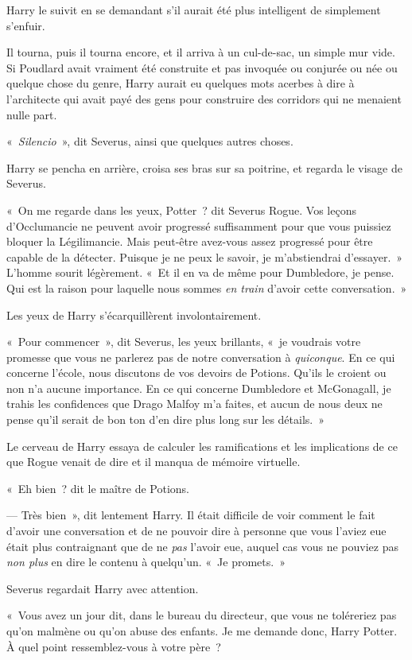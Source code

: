 Harry le suivit en se demandant s'il aurait été plus intelligent de simplement s'enfuir.

Il tourna, puis il tourna encore, et il arriva à un cul-de-sac, un simple mur vide.
Si Poudlard avait vraiment été construite et pas invoquée ou conjurée ou née ou quelque chose du genre, Harry aurait eu quelques mots acerbes à dire à l'architecte qui avait payé des gens pour construire des corridors qui ne menaient nulle part.

«~\emph{Silencio}~», dit Severus, ainsi que quelques autres choses.

Harry se pencha en arrière, croisa ses bras sur sa poitrine, et regarda le visage de Severus.

«~On me regarde dans les yeux, Potter~? dit Severus Rogue.
Vos leçons d'Occlumancie ne peuvent avoir progressé suffisamment pour que vous puissiez bloquer la Légilimancie.
Mais peut-être avez-vous assez progressé pour être capable de la détecter.
Puisque je ne peux le savoir, je m'abstiendrai d'essayer.~»
L'homme sourit légèrement.
«~Et il en va de même pour Dumbledore, je pense.
Qui est la raison pour laquelle nous sommes \emph{en train} d'avoir cette conversation.~»

Les yeux de Harry s'écarquillèrent involontairement.

«~Pour commencer~», dit Severus, les yeux brillants, «~je voudrais votre promesse que vous ne parlerez pas de notre conversation à \emph{quiconque}.
En ce qui concerne l'école, nous discutons de vos devoirs de Potions.
Qu'ils le croient ou non n'a aucune importance.
En ce qui concerne Dumbledore et McGonagall, je trahis les confidences que Drago Malfoy m'a faites, et aucun de nous deux ne pense qu'il serait de bon ton d'en dire plus long sur les détails.~»

Le cerveau de Harry essaya de calculer les ramifications et les implications de ce que Rogue venait de dire et il manqua de mémoire virtuelle.

«~Eh bien~? dit le maître de Potions.

--- Très bien~», dit lentement Harry.
Il était difficile de voir comment le fait d'avoir une conversation et de ne pouvoir dire à personne que vous l'aviez eue était plus contraignant que de ne \emph{pas} l'avoir eue, auquel cas vous ne pouviez pas \emph{non plus} en dire le contenu à quelqu'un.
«~Je promets.~»

Severus regardait Harry avec attention.

«~Vous avez un jour dit, dans le bureau du directeur, que vous ne toléreriez pas qu'on malmène ou qu'on abuse des enfants.
Je me demande donc, Harry Potter.
À quel point ressemblez-vous à votre père~?

